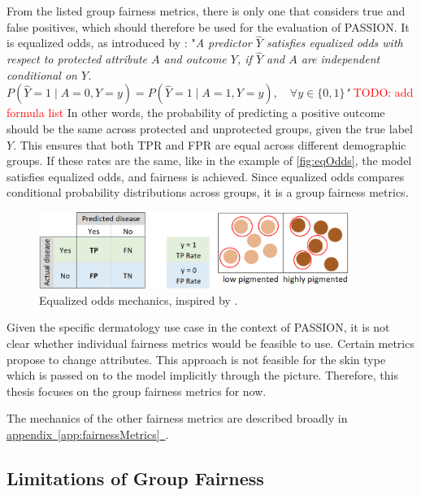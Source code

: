 \documentclass[12pt, a4paper, oneside]{book}   	%
\renewcommand{\todo}[1]{\textcolor{red}{TODO: #1}}
\newcommand{\linkapp}[1]{\hyperref[#1]{appendix~\ref{#1}~\nameref{#1}}}
\begin{document}
		From the listed group fairness metrics, there is only one that considers true and false positives, which should therefore be used for the evaluation of PASSION. It is equalized odds, as introduced by \textcite{M63_Hardt_2016}: \newline
		"\textit{A predictor $\hat{Y}$ satisfies equalized odds with respect to protected attribute $A$ and outcome $Y$, if $\hat{Y}$ and $A$ are independent conditional on $Y$. \newline
		\(
		P(\hat{Y} = 1 \mid A = 0, Y = y) = P(\hat{Y} = 1 \mid A = 1, Y = y), \quad \forall y \in \{0, 1\}
		\)"} \todo{add formula list} \newline
		In other words, the probability of predicting a positive outcome should be the same across protected and unprotected groups, given the true label $Y$. This ensures that both \gls{TPR} and \gls{FPR} are equal across different demographic groups. If these rates are the same, like in the example of \autoref{fig:eqOdds}, the model satisfies equalized odds, and fairness is achieved. Since equalized odds compares conditional probability distributions across groups, it is a group fairness metrics.
		
		\begin{figure}[H]
			\centering
			\includegraphics[width=0.9\textwidth]{figures/EqualizedOddsIllustration.png}
			\caption{Equalized odds mechanics, inspired by \autocite{M80_Kearns_2019}.}
			\label{fig:eqOdds}
		\end{figure}
		
		Given the specific dermatology use case in the context of PASSION, it is not clear whether individual fairness metrics would be feasible to use. Certain metrics propose to change attributes. This approach is not feasible for the skin type which is passed on to the model implicitly through the picture. Therefore, this thesis focuses on the group fairness metrics for now.
		
		The mechanics of the other fairness metrics are described broadly in \linkapp{app:fairnessMetrics}.
		
		\subsection{Limitations of Group Fairness}
		
\end{document}
